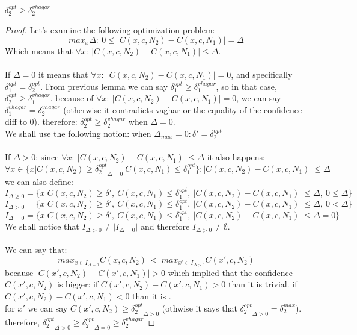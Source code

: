 \begin{lemma}
$\delta_2^{opt} \geq \delta^{vhagar}_2$
\end{lemma}
\begin{proof}
Let's examine the following optimization problem:
$$ max_x{\Delta}:\ 0 \leq |C(x,c,N_2)-C(x,c,N_1)|=\Delta $$
Which means that $\forall{x}:\ |C(x,c,N_2)-C(x,c,N_1)| \leq \Delta$.\\ \\
If $\Delta=0$ it means that $\forall{x}:\ |C(x,c,N_2)-C(x,c,N_1)|=0$, and specifically $\delta_1^{opt}=\delta_2^{opt}$. From previous lemma we can say $\delta_1^{opt} \geq \delta^{vhagar}_1$, so in that case, $\delta_2^{opt} \geq \delta^{vhagar}_1$. because of $\forall{x}:\ |C(x,c,N_2)-C(x,c,N_1)|=0$, we can say $\delta^{vhagar}_1=\delta^{vhagar}_2$ (otherwise it contradicts vaghar or the equality of the confidence-diff to 0). therefore: $\delta_2^{opt} \geq \delta^{vhagar}_2$ when $\Delta=0$.\\
We shall use the following notion: when $\Delta_{max}=0: \delta'=\delta_2^{opt}$ \\ \\
If $\Delta>0$: since $\forall{x}:\ |C(x,c,N_2)-C(x,c,N_1)| \leq \Delta$ it also happens:  
$$\forall{x}\in{\{x| C(x,c,N_2)\geq{{\delta_2^{opt}}_{\Delta=0}}\ C(x,c,N_1)\leq{\delta_1^{opt}}\}}: |C(x,c,N_2)-C(x,c,N_1)| \leq \Delta$$
we can also define:
$$ I_{\Delta\geq 0}= \{x| C(x,c,N_2)\geq{\delta'},\ C(x,c,N_1)\leq{\delta_1^{opt},\ |C(x,c,N_2)-C(x,c,N_1)| \leq \Delta,\ 0 \leq \Delta}\}$$
$$ I_{\Delta > 0}= \{x| C(x,c,N_2)\geq{\delta'},\ C(x,c,N_1)\leq{\delta_1^{opt},\ |C(x,c,N_2)-C(x,c,N_1)| \leq \Delta,\ 0 < \Delta}\}$$
$$ I_{\Delta=0}= \{x| C(x,c,N_2)\geq{\delta'},\ C(x,c,N_1)\leq{\delta_1^{opt},\ |C(x,c,N_2)-C(x,c,N_1)| \leq \Delta=0}\}$$
We shall notice that $I_{\Delta>0} \ne |I_{\Delta=0}|$ and therefore $I_{\Delta > 0} \ne \emptyset$.\\ \\
We can say that:
$$ max_{x\in{I_{\Delta=0}}}{C(x,c,N_2)}\ <\  max_{x'\in{I_{\Delta>0}}}{C(x',c,N_2)}$$
because  $|C(x',c,N_2)-C(x',c,N_1)|>0$ which implied that the confidence $C(x',c,N_2)$ is bigger: if $C(x',c,N_2)-C(x',c,N_1)>0$ than it is trivial. if $C(x',c,N_2)-C(x',c,N_1)<0$ than it is  .\\
for $x'$ we can say $C(x',c,N_2) \geq {\delta_2^{opt}}_{\Delta>0}$ (othwise it says that ${\delta_2^{opt}}_{\Delta>0}=\delta_2^{max}$). \\
therefore, ${\delta_2^{opt}}_{\Delta>0} \geq {\delta_2^{opt}}_{\Delta=0}\geq{\delta_2^{vhagar}}$





\end{proof}

